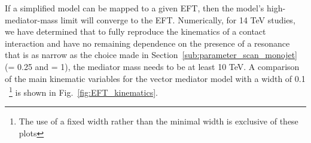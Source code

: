 If a simplified model can be mapped to a given EFT, then the model's high-mediator-mass limit  will converge to the EFT.
Numerically, for 14 TeV studies, we have
determined that to fully reproduce the kinematics of a contact
interaction and have no remaining dependence on the presence of a resonance
that is as narrow as the choice made in Section~\ref{sub:parameter_scan_monojet} (\gq = 0.25 and \gDM = 1),
the mediator mass needs to be at least 10 TeV. A comparison of the main kinematic variables for the \schannel vector 
mediator model with a width of 0.1 \mMed~\footnote{The use of a fixed width rather than the minimal width is exclusive of these plots} 
is shown in Fig.~\ref{fig:EFT_kinematics}.


